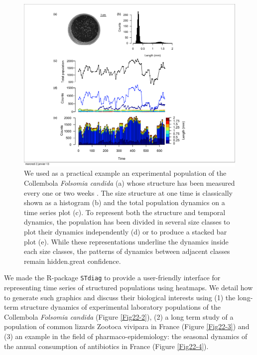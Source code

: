 \begin{figure}[!h] %
\centering
\includegraphics[height=0.75\textheight]{2_Methodo/Fig/Fig22-1.pdf}
\caption[Classical representation of a
population structure]{ We used as a practical example an experimental population
of the Collembola \textit{Folsomia candida} (a) whose structure has been measured every one or two weeks . The size structure at one time is classically shown as a histogram (b) and the total population dynamics on a time series plot (c). To represent both the structure and temporal dynamics, the population has been divided in
several size classes to plot their dynamics independently (d) or to produce a
stacked bar plot (e). While these representations underline the dynamics inside
each size classes, the patterns of dynamics between adjacent classes remain
hidden.great confidence.
}
\label{Fig22-1}
\end{figure}


We made the R-package \texttt{STdiag} to provide a user-friendly interface for
representing time series of structured populations using heatmaps. We detail how
to generate such graphics and discuss their biological interests using (1) the
long-term structure dynamics of experimental laboratory populations of the
Collembola \textit{Folsomia candida} (Figure \ref{Fig22-2}), (2) a long term study of a population of
common lizards Zootoca vivipara in France (Figure \ref{Fig22-3}) and (3) an example in the
field of pharmaco-epidemiology: the seasonal dynamics of the annual consumption
of antibiotics in France (Figure \ref{Fig22-4}).

